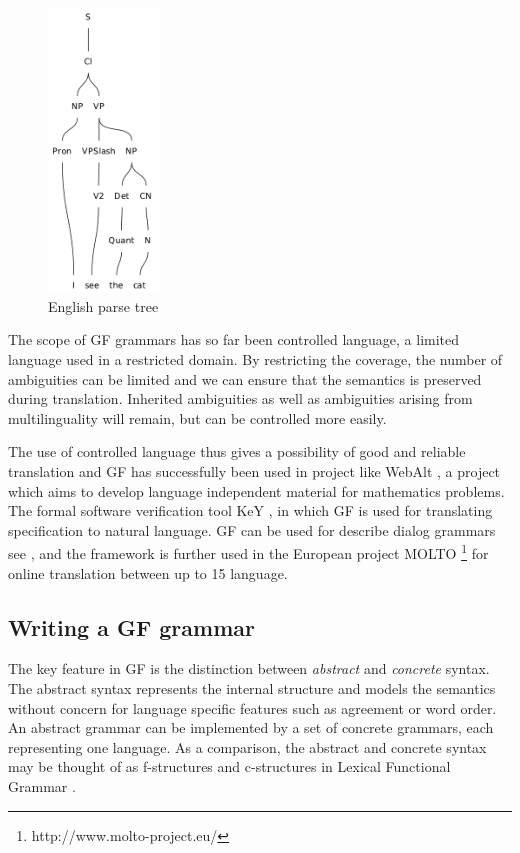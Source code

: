 \documentclass{report}
\begin{document}
\newpage
\begin{figure}
\includegraphics[width=30mm]{gfETree.png}
\caption{English parse tree}
\label{pic:gfEtree}
\end{figure}


The scope of GF grammars has so far been controlled language, a limited
language used in a restricted domain. By
restricting the coverage, the number of ambiguities
can be limited and we can ensure that the semantics is preserved during
translation. Inherited ambiguities as well as ambiguities arising from multilinguality will
remain, but can be controlled more easily. %

The use of controlled language thus gives a possibility of good and reliable translation
and GF has successfully been used in project like %
WebAlt \cite{webalt}, a project which aims to develop language independent
material for mathematics problems. The formal software verification tool
KeY \cite{key}, in which GF is used for translating specification to natural language.
GF can be used for describe dialog grammars see \cite{talk}, and
the framework is further used in the
European project MOLTO \footnote{http://www.molto-project.eu/} for online
translation between up to 15 language.\\

\vspace{10mm}
\subsection{Writing a GF grammar}
\label{sec:writegf}
The key feature in GF is the distinction between
\textit{abstract} and \textit{concrete} syntax. The abstract syntax represents
the internal structure and models the semantics without concern for language
specific features such as agreement or word order.
An abstract grammar can be implemented by a set of concrete grammars, each
representing one language. As a comparison, the abstract and concrete syntax
may be thought of as f-structures and c-structures in Lexical Functional
Grammar \cite{lfg}.
\end{document}
